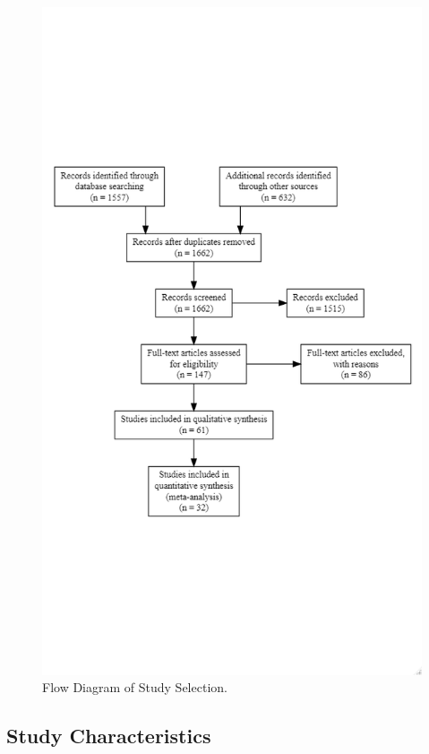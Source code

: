 \documentclass[
  english,
  man, donotrepeattitle,mask,floatsintext]{apa7}
\begin{document}
\begin{figure}

{\centering \includegraphics[width=1\linewidth,height=1\textheight]{../../figures/figure1} 

}

\caption{Flow Diagram of Study Selection.}\label{fig:fig1}
\end{figure}

\hypertarget{study-characteristics}{%
\subsection{Study Characteristics}\label{study-characteristics}}
\end{document}

